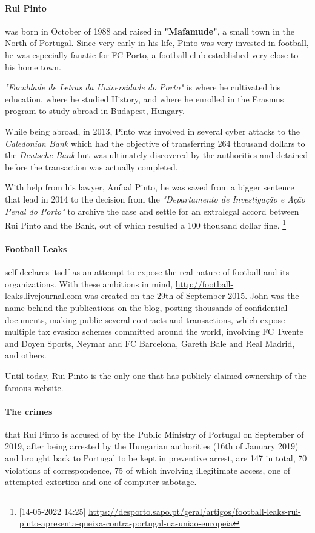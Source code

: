 \paragraph{Rui Pinto}
was born in October of 1988 and raised in \textbf{"Mafamude"}, a small town in the North of Portugal.
Since very early in his life, Pinto was very invested in football, he was especially fanatic for FC Porto, a football club established very close to his home town.

\textit{"Faculdade de Letras da Universidade do Porto"} is where he cultivated his education, where he studied History, and where he enrolled in the Erasmus program to study abroad in Budapest, Hungary.

While being abroad, in 2013, Pinto was involved in several cyber attacks to the \textit{Caledonian Bank} which had the objective of transferring 264 thousand dollars to the \textit{Deutsche Bank} but was ultimately discovered by the authorities and detained before the transaction was actually completed.

With help from his lawyer, Aníbal Pinto, he was saved from a bigger sentence that lead in 2014 to the decision from the \textit{"Departamento de Investigação e Ação Penal do Porto"} to archive the case and settle for an extralegal accord between Rui Pinto and the Bank, out of which resulted a 100 thousand dollar fine.
\footnote{[14-05-2022 14:25] \url{https://desporto.sapo.pt/geral/artigos/football-leaks-rui-pinto-apresenta-queixa-contra-portugal-na-uniao-europeia}}


\paragraph{Football Leaks} self declares itself as an attempt to expose the real nature of football and its organizations.
With these ambitions in mind, \url{http://football-leaks.livejournal.com} was created on the 29th of September 2015.
John was the name behind the publications on the blog, posting thousands of confidential documents, making public several contracts and transactions, which expose multiple tax evasion schemes committed around the world, involving FC Twente and Doyen Sports, Neymar and FC Barcelona, Gareth Bale and Real Madrid, and others.

Until today, Rui Pinto is the only one that has publicly claimed ownership of the famous website.

\paragraph{The crimes} that Rui Pinto is accused of by the Public Ministry of Portugal on September of 2019, after being arrested by the Hungarian authorities (16th of January 2019) and brought back to Portugal to be kept in preventive arrest, are 147 in total, 70 violations of correspondence, 75 of which involving illegitimate access, one of attempted extortion and one of computer sabotage.

